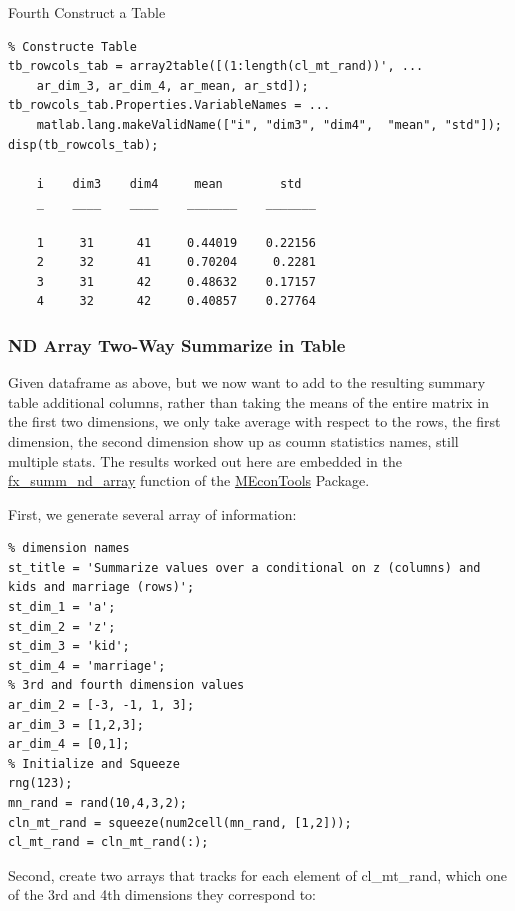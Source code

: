 \documentclass[
]{book}
\begin{document}
Fourth Construct a Table

\begin{verbatim}
% Constructe Table
tb_rowcols_tab = array2table([(1:length(cl_mt_rand))', ...
    ar_dim_3, ar_dim_4, ar_mean, ar_std]);
tb_rowcols_tab.Properties.VariableNames = ...
    matlab.lang.makeValidName(["i", "dim3", "dim4",  "mean", "std"]);
disp(tb_rowcols_tab);

    i    dim3    dim4     mean        std  
    _    ____    ____    _______    _______

    1     31      41     0.44019    0.22156
    2     32      41     0.70204     0.2281
    3     31      42     0.48632    0.17157
    4     32      42     0.40857    0.27764
\end{verbatim}

\hypertarget{nd-array-two-way-summarize-in-table}{%
\subsubsection{ND Array Two-Way Summarize in Table}\label{nd-array-two-way-summarize-in-table}}

Given dataframe as above, but we now want to add to the resulting
summary table additional columns, rather than taking the means of the
entire matrix in the first two dimensions, we only take average with
respect to the rows, the first dimension, the second dimension show up
as coumn statistics names, still multiple stats. The results worked out
here are embedded in the
\href{https://fanwangecon.github.io/MEconTools/MEconTools/doc/summ/htmlpdfm/fx_summ_nd_array.html}{fx\_summ\_nd\_array}
function of the \href{https://fanwangecon.github.io/MEconTools/}{MEconTools}
Package.

First, we generate several array of information:

\begin{verbatim}
% dimension names
st_title = 'Summarize values over a conditional on z (columns) and kids and marriage (rows)';
st_dim_1 = 'a';
st_dim_2 = 'z';
st_dim_3 = 'kid';
st_dim_4 = 'marriage';
% 3rd and fourth dimension values
ar_dim_2 = [-3, -1, 1, 3];
ar_dim_3 = [1,2,3];
ar_dim_4 = [0,1];
% Initialize and Squeeze
rng(123);
mn_rand = rand(10,4,3,2);
cln_mt_rand = squeeze(num2cell(mn_rand, [1,2]));
cl_mt_rand = cln_mt_rand(:);
\end{verbatim}

Second, create two arrays that tracks for each element of cl\_mt\_rand,
which one of the 3rd and 4th dimensions they correspond to:
\end{document}
